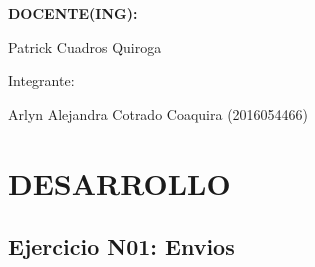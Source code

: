 \documentclass[12pt,letterpaper]{article}
\begin{document}
\begin{titlepage}
\begin{center}
\vspace*{0.3in}
\begin{Large}
\textbf{DOCENTE(ING):} \\
\end{Large}

\vspace*{0.1in}
\begin{large}
 Patrick Cuadros Quiroga\\
\end{large}

\vspace*{0.2in}
\vspace*{0.1in}
\begin{large}
Integrante: \\
\begin{flushleft}
Arlyn Alejandra Cotrado Coaquira	\hfill	(2016054466) 
\end{flushleft}
\end{large}
\end{center}

\end{titlepage}



\thispagestyle{empty} %
\newpage
\setcounter{page}{1} %


\section{DESARROLLO}
\subsection{Ejercicio N01: Envios}
\end{document}
